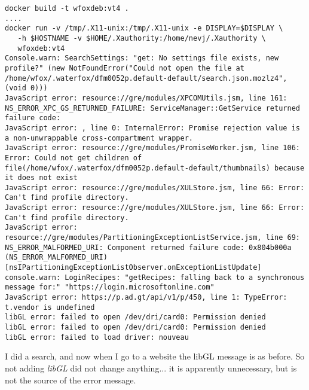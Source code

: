 \documentclass[a4paper]{article}  %
\begin{document}
\begin{tcolorbox}[breakable]
\begin{verbatim}
docker build -t wfoxdeb:vt4 .
....
docker run -v /tmp/.X11-unix:/tmp/.X11-unix -e DISPLAY=$DISPLAY \
   -h $HOSTNAME -v $HOME/.Xauthority:/home/nevj/.Xauthority \
   wfoxdeb:vt4
Console.warn: SearchSettings: "get: No settings file exists, new profile?" (new NotFoundError("Could not open the file at /home/wfox/.waterfox/dfm0052p.default-default/search.json.mozlz4", (void 0)))
JavaScript error: resource://gre/modules/XPCOMUtils.jsm, line 161: NS_ERROR_XPC_GS_RETURNED_FAILURE: ServiceManager::GetService returned failure code:
JavaScript error: , line 0: InternalError: Promise rejection value is a non-unwrappable cross-compartment wrapper.
JavaScript error: resource://gre/modules/PromiseWorker.jsm, line 106: Error: Could not get children of file(/home/wfox/.waterfox/dfm0052p.default-default/thumbnails) because it does not exist
JavaScript error: resource://gre/modules/XULStore.jsm, line 66: Error: Can't find profile directory.
JavaScript error: resource://gre/modules/XULStore.jsm, line 66: Error: Can't find profile directory.
JavaScript error: resource://gre/modules/PartitioningExceptionListService.jsm, line 69: NS_ERROR_MALFORMED_URI: Component returned failure code: 0x804b000a (NS_ERROR_MALFORMED_URI) [nsIPartitioningExceptionListObserver.onExceptionListUpdate]
console.warn: LoginRecipes: "getRecipes: falling back to a synchronous message for:" "https://login.microsoftonline.com"
JavaScript error: https://p.ad.gt/api/v1/p/450, line 1: TypeError: t.vendor is undefined
libGL error: failed to open /dev/dri/card0: Permission denied
libGL error: failed to open /dev/dri/card0: Permission denied
libGL error: failed to load driver: nouveau
\end{verbatim}
\end{tcolorbox}
I did a search, and now when I go to a website the libGL message is as before. So not adding {\em libGL} did not change anything... it is apparently unnecessary, but is not the source of the error message.  
\end{document}
